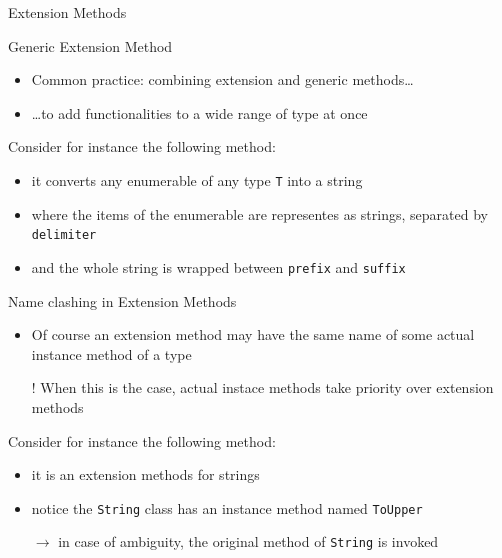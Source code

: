 \documentclass[presentation]{beamer}
\begin{document}
\begin{frame}[allowframebreaks]{Extension Methods}
  \framebreak

  \begin{alertblock}{Generic Extension Method}
    \begin{itemize}
      \item Common practice: combining extension and generic methods\ldots
      \item \ldots to add functionalities to a wide range of type at once
    \end{itemize}
  \end{alertblock}

  \framebreak

  Consider for instance the following method:
  \begin{itemize}
    \item it converts any enumerable of any type \texttt{T} into a string
    \item where the items of the enumerable are representes as strings, separated by \texttt{delimiter}
    \item and the whole string is wrapped between \texttt{prefix} and \texttt{suffix}
  \end{itemize}


  \framebreak

  \begin{alertblock}{Name clashing in Extension Methods}
    \begin{itemize}
      \item Of course an extension method may have the same name of some actual instance method of a type
      \item[!] When this is the case, actual instace methods take priority over extension methods
    \end{itemize}
  \end{alertblock}

  \framebreak

  Consider for instance the following method:
  \begin{itemize}
    \item it is an extension methods for strings
    \item notice the \texttt{String} class has an instance method named \texttt{ToUpper}
    \item[$\rightarrow$] in case of ambiguity, the original method of \texttt{String} is invoked
  \end{itemize}


\end{frame}
\end{document}
